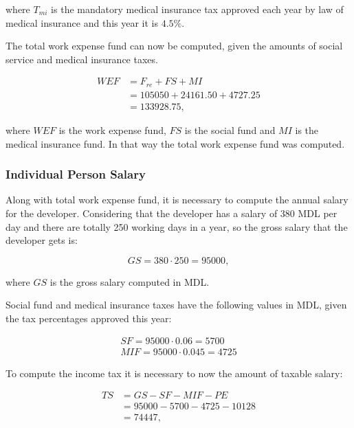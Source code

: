 \noindent where $T_{mi}$ is the mandatory medical insurance tax approved each
year by law of medical insurance and this year it is $4.5\%$.

The total work expense fund can now be computed, given the amounts of social
service and medical insurance taxes.

\begin{equation}
\begin{split}
 WEF &= F_{re} + FS + MI\\
     &= 105050 + 24161.50 + 4727.25\\
     &= 133928.75,
\end{split}
\end{equation}

\noindent where $WEF$ is the work expense fund, $FS$ is the social fund and $MI$
is the medical insurance fund. In that way the total work expense fund was
computed.


\subsubsection{Individual Person Salary}

Along with total work expense fund, it is necessary to compute the annual
salary for the developer. Considering that the developer has a salary of 380
MDL per day and there are totally 250 working days in a year, so the gross
salary that the developer gets is:

\begin{equation}
GS = 380 \cdot 250 = 95000,
\end{equation}

\noindent where $GS$ is the gross salary computed in MDL.

Social fund and medical insurance taxes have the following values in MDL,
given the tax percentages approved this year:

\begin{equation}
\begin{split}
SF = 95000 \cdot 0.06 = 5700\\
MIF = 95000 \cdot 0.045 = 4725
\end{split}
\end{equation}

To compute the income tax it is necessary to now the amount of taxable salary:

\begin{equation}
\begin{split}
 TS &= GS - SF - MIF - PE \\
              &= 95000 - 5700 - 4725 - 10128\\
              &= 74447,
\end{split}
\end{equation}

